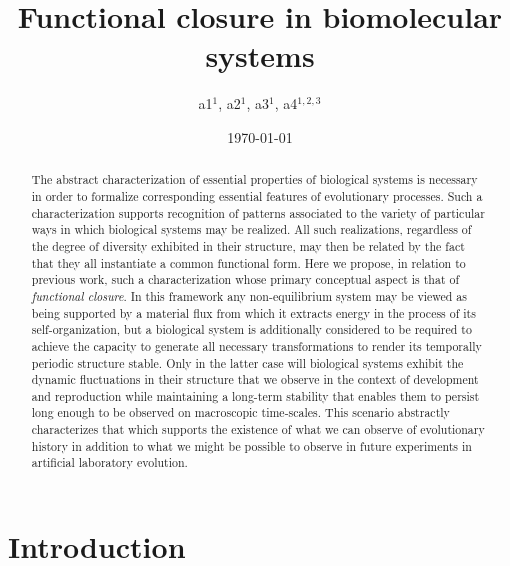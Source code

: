 \documentclass[aps,twocolumn]{revtex4-1}
\begin{document}
 

\title{\bf Functional closure in biomolecular systems}

\author{a1$^{1}$, a2$^{1}$, a3$^{1}$, a4$^{1,2,3}$}


\date{\today}
\begin{abstract}
The abstract characterization of essential properties of biological systems is necessary in order to formalize corresponding essential features of evolutionary processes. Such a characterization supports recognition of patterns associated to the variety of particular ways in which biological systems may be realized. All such realizations, regardless of the degree of diversity exhibited in their structure, may then be related by the fact that they all instantiate a common functional form. Here we propose, in relation to previous work, such a characterization whose primary conceptual aspect is that of {\it functional closure}. In this framework any non-equilibrium system may be viewed as being supported by a material flux from which it extracts energy in the process of its self-organization, but a biological system is additionally considered to be required to achieve the capacity to generate all necessary transformations to render its temporally periodic structure stable. Only in the latter case will biological systems exhibit the dynamic fluctuations in their structure that we observe in the context of development and reproduction while maintaining a long-term stability that enables them to persist long enough to be observed on macroscopic time-scales. This scenario abstractly characterizes that which supports the existence of what we can observe of evolutionary history in addition to what we might be possible to observe in future experiments in artificial laboratory evolution.
\end{abstract}

\maketitle

\tableofcontents

\section{Introduction}
\end{document}
